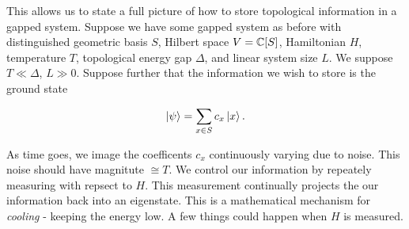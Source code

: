 \documentclass{article}
\theoremstyle{definition}
\numberwithin{figure}{section}
\begin{document}
This allows us to state a full picture of how to store topological information in a gapped system. Suppose we have some gapped system as before with distinguished geometric basis $S$, Hilbert space $V=\mathbb{C}[S]$, Hamiltonian $H$, temperature $T$, topological energy gap $\Delta$, and linear system size $L$. We suppose $T\ll \Delta$, $L\gg 0$. Suppose further that the information we wish to store is the ground state

$$\ket{\psi}=\sum_{x\in S}c_x \ket{x}.$$

As time goes, we image the coefficents $c_x$ continuously varying due to noise. This noise should have magnitute $\cong T$. We control our information by repeately measuring with repsect to $H$. This measurement continually projects the our information back into an eigenstate. This is a mathematical mechanism for \textit{cooling} - keeping the energy low. A few things could happen when $H$ is measured.
\end{document}
